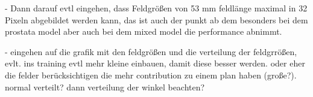 - Dann darauf evtl eingehen, dass Feldgrößen von 53 mm feldlänge maximal in 32 Pixeln abgebildet werden kann, das ist auch der punkt ab dem besonders bei dem prostata model aber auch bei dem mixed model die performance abnimmt. 



- eingehen auf die grafik mit den feldgrößen und die verteilung der feldgrrößen, evlt. ins training evtl mehr kleine einbauen, damit diese besser werden. oder eher die felder berücksichtigen die mehr contribution zu einem plan haben (große?). normal verteilt? dann verteilung  der winkel beachten?




